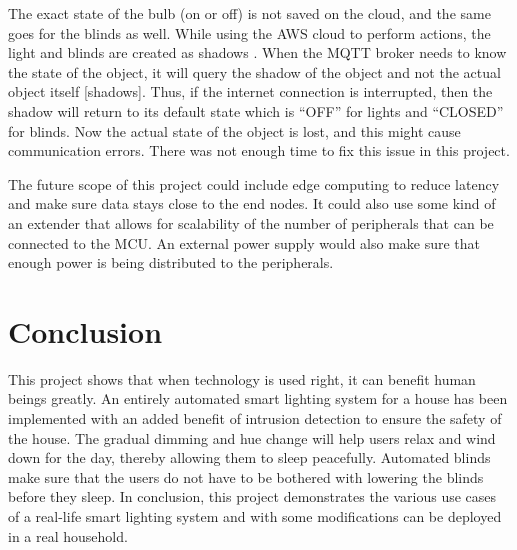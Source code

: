 \documentclass[conference]{IEEEtran}
\begin{document}
The exact state of the bulb (on or off) is not saved on the cloud, and the same goes for the blinds as well. While using the AWS cloud to perform actions, the light and blinds are created as shadows \cite{aws_shadows}. When the MQTT broker needs to know the state of the object, it will query the shadow of the object and not the actual object itself [shadows]. Thus, if the internet connection is interrupted, then the shadow will return to its default state which is “OFF” for lights and “CLOSED” for blinds. Now the actual state of the object is lost, and this might cause communication errors. There was not enough time to fix this issue in this project.

The future scope of this project could include edge computing to reduce latency and make sure data stays close to the end nodes. It could also use some kind of an extender that allows for scalability of the number of peripherals that can be connected to the MCU. An external power supply would also make sure that enough power is being distributed to the peripherals.

\section{Conclusion}

This project shows that when technology is used right, it can benefit human beings greatly. An entirely automated smart lighting system for a house has been implemented with an added benefit of intrusion detection to ensure the safety of the house. The gradual dimming and hue change will help users relax and wind down for the day, thereby allowing them to sleep peacefully. Automated blinds make sure that the users do not have to be bothered with lowering the blinds before they sleep. In conclusion, this project demonstrates the various use cases of a real-life smart lighting system and with some modifications can be deployed in a real household.
\end{document}
